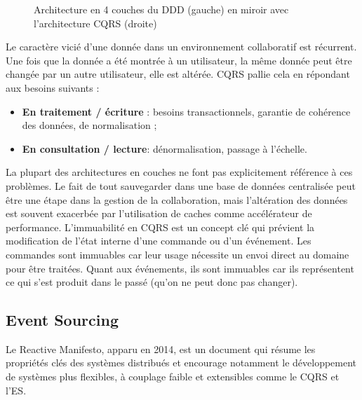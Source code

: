 \begin{figure}[ht]
	\noindent
	\centering
	\caption{Architecture en 4 couches du DDD (gauche) en miroir avec 
		l'architecture CQRS 
		(droite)}
	\label{fig:dddcqrs}
\end{figure}


Le caractère vicié d'une donnée dans un environnement 
collaboratif est récurrent. Une fois que la donnée a été montrée à un utilisateur, la 
même donnée peut être changée par un autre utilisateur, elle est altérée. 
\gls{CQRS} pallie cela en répondant aux besoins suivants :
\begin{itemize}
	\item \textbf{En traitement / écriture} : besoins transactionnels, garantie de cohérence 
	des données, de normalisation ;
	\item \textbf{En consultation / lecture}: dénormalisation, passage à l'échelle.
\end{itemize}

La plupart des architectures en couches ne font pas explicitement référence à ces 
problèmes. Le fait de tout sauvegarder dans une base de données centralisée peut 
être une étape dans la gestion de la collaboration, mais l'altération des données est 
souvent exacerbée par l'utilisation de caches comme accélérateur de performance.
L'immuabilité en \gls{CQRS} est un concept clé qui prévient la  
modification de l'état interne d'une commande ou d'un événement. Les 
commandes sont immuables car leur usage nécessite un envoi direct au domaine 
pour être traitées. Quant aux événements, ils sont immuables car ils représentent 
ce qui s'est produit dans le passé (qu'on ne peut donc pas changer). 

\subsection{Event Sourcing}
\label{sec:es}

Le Reactive Manifesto, apparu en 2014, est un document qui résume les 
propriétés clés des systèmes distribués et encourage notamment le 
développement de systèmes \og plus flexibles, à couplage faible et 
extensibles\fg{}\cite{Boner2014} comme le \gls{CQRS} et l'\gls{ES}.

